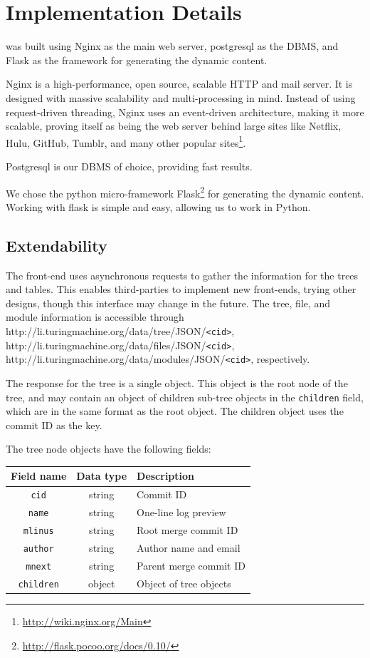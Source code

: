 \documentclass[conference, draftclsnofoot, draft]{IEEEtran}
\begin{document}
\section{Implementation Details}

\tool was built using Nginx as the main web server, postgresql as the DBMS, and
Flask as the framework for generating the dynamic content.

Nginx is a high-performance, open source, scalable HTTP and mail server. It is designed with massive
scalability and multi-processing in mind. Instead of using request-driven threading,
Nginx uses an event-driven architecture, making it more scalable, proving itself as
being the web server behind large sites like Netflix, Hulu, GitHub, Tumblr, and many
other popular sites\footnote{\url{http://wiki.nginx.org/Main}}.

Postgresql is our DBMS of choice, providing fast results.

We chose the python micro-framework
Flask\footnote{\url{http://flask.pocoo.org/docs/0.10/}} for generating the dynamic
content. Working with flask is simple and easy, allowing us to work in Python.

\subsection{Extendability}

The front-end uses asynchronous requests to gather the information for the trees and
tables. This enables third-parties to implement new front-ends, trying other
designs, though this interface may change in the future. The tree, file, and module
information is accessible through
http://li.turingmachine.org/data/tree/JSON/\verb|<cid>|,
http://li.turingmachine.org/data/files/JSON/\verb|<cid>|,
http://li.turingmachine.org/data/modules/JSON/\verb|<cid>|, respectively.

The response for the tree is a single object. This object is the root node of the
tree, and may contain an object of children sub-tree objects in the \verb|children|
field, which are in the same format as the root object. The children object uses the
commit ID as the key.

The tree node objects have the following fields:

\begin{tabular}{ccl}
        Field name      & Data type & Description\\\hline
        \verb|cid|      & string    & Commit ID\\
        \verb|name|     & string    & One-line log preview\\
        \verb|mlinus|   & string    & Root merge commit ID\\
        \verb|author|   & string    & Author name and email\\
        \verb|mnext|    & string    & Parent merge commit ID\\
        \verb|children| & object    & Object of tree objects\\
\end{tabular}
\end{document}
